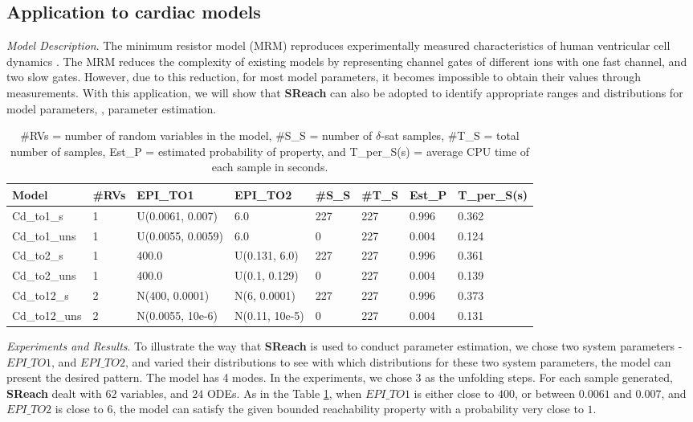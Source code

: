 \subsection{Application to cardiac models}

\textit{Model Description}.
The minimum resistor model (MRM) reproduces experimentally measured characteristics 
of human ventricular cell dynamics \cite{bueno2008minimal}. 
The MRM reduces the complexity of existing models by representing channel gates of different ions with one fast channel, and two slow gates. However, due to this reduction, for most model parameters, it becomes impossible to obtain their values through measurements. With this application, we will show that {\bf SReach} can also be adopted to identify appropriate ranges and distributions for model parameters, \ie, parameter estimation.
\begin{table}[h]
\centering
    \begin{tabular}{|l|l|l|l|l|l|l|l|}
    \hline
    Model         & \#RVs & EPI\_TO1            & EPI\_TO2         & \#S\_S & \#T\_S & Est\_P & T\_per\_S(s) \\ \hline
    Cd\_to1\_s    & 1     & U(0.0061, 0.007)    & 6.0              & 227       & 227      & 0.996     & 0.362        \\ \hline
    Cd\_to1\_uns  & 1     & U(0.0055, 0.0059)   & 6.0              & 0         & 227      & 0.004     & 0.124        \\ \hline
    Cd\_to2\_s    & 1     & 400.0               & U(0.131, 6.0)    & 227       & 227      & 0.996     & 0.361        \\ \hline
    Cd\_to2\_uns  & 1     & 400.0               & U(0.1, 0.129)    & 0         & 227      & 0.004     & 0.139        \\ \hline
    Cd\_to12\_s   & 2     & N(400, 0.0001)      & N(6, 0.0001)     & 227       & 227      & 0.996     & 0.373        \\ \hline
    Cd\_to12\_uns & 2     & N(0.0055, 10e-6) & N(0.11, 10e-5) & 0         & 227      & 0.004     & 0.131        \\ \hline
    \end{tabular}
    \caption { \#RVs = number of random variables in the model, \#S\_S = number of $\delta$-sat samples, 
\#T\_S = total number of samples, Est\_P = estimated probability of property, and T\_per\_S(s) = average 
CPU time of each sample in seconds.}
    \label{table:cardiac}
\end{table}

\textit{Experiments and Results}. To illustrate the way that {\bf SReach} is used to conduct parameter estimation, we chose two system parameters - $EPI\_TO1$, and $EPI\_TO2$, and varied their distributions to see with which distributions for these two system parameters, the model can present the desired pattern. The model has 4 modes. In the experiments, we chose $3$ as the unfolding steps. For each sample generated, {\bf SReach} dealt with $62$ variables, and $24$ ODEs. As in the Table \ref{table:cardiac}, when $EPI\_TO1$ is either close to $400$, or between $0.0061$ and $0.007$, and $EPI\_TO2$ is close to $6$, the model can satisfy the given bounded reachability property with a probability very close to $1$. 

